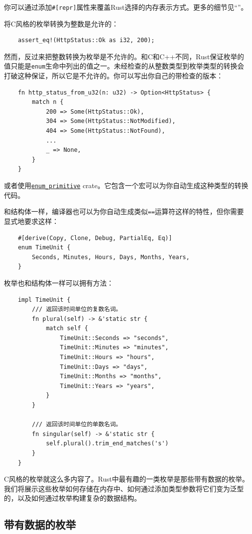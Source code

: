 你可以通过添加\texttt{\#[repr]}属性来覆盖Rust选择的内存表示方式。更多的细节见“”。

将C风格的枚举转换为整数是允许的：
\begin{verbatim}
    assert_eq!(HttpStatus::Ok as i32, 200);
\end{verbatim}

然而，反过来把整数转换为枚举是不允许的。和C和C++不同，Rust保证枚举的值只能是\texttt{enum}生命中列出的值之一。未经检查的从整数类型到枚举类型的转换会打破这种保证，所以它是不允许的。你可以写出你自己的带检查的版本：
\begin{verbatim}
    fn http_status_from_u32(n: u32) -> Option<HttpStatus> {
        match n {
            200 => Some(HttpStatus::Ok),
            304 => Some(HttpStatus::NotModified),
            404 => Some(HttpStatus::NotFound),
            ...
            _ => None,
        }
    }
\end{verbatim}

或者使用\href{https://crates.io/crates/enum_primitive}{\texttt{enum\_primitive}} crate。它包含一个宏可以为你自动生成这种类型的转换代码。

和结构体一样，编译器也可以为你自动生成类似\texttt{==}运算符这样的特性，但你需要显式地要求这样：
\begin{verbatim}
    #[derive(Copy, Clone, Debug, PartialEq, Eq)]
    enum TimeUnit {
        Seconds, Minutes, Hours, Days, Months, Years,
    }
\end{verbatim}

枚举也和结构体一样可以拥有方法：
\begin{verbatim}
    impl TimeUnit {
        /// 返回该时间单位的复数名词。
        fn plural(self) -> &'static str {
            match self {
                TimeUnit::Seconds => "seconds",
                TimeUnit::Minutes => "minutes",
                TimeUnit::Hours => "hours",
                TimeUnit::Days => "days",
                TimeUnit::Months => "months",
                TimeUnit::Years => "years",
            }
        }

        /// 返回该时间单位的单数名词。
        fn singular(self) -> &'static str {
            self.plural().trim_end_matches('s')
        }
    }
\end{verbatim}

C风格的枚举就这么多内容了。Rust中最有趣的一类枚举是那些带有数据的枚举。我们将展示这些枚举如何存储在内存中、如何通过添加类型参数将它们变为泛型的，以及如何通过枚举构建复杂的数据结构。

\subsection{带有数据的枚举}

